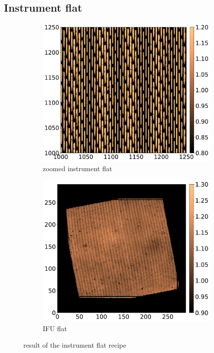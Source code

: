 \documentclass[twoside,single,12pt]{lion-msc}
\begin{document}
\subsection{Instrument flat}
\begin{figure}[!b]
\centering
\begin{subfigure}{.48\textwidth}
  \centering
  \includegraphics[width=1\linewidth]{instrumentflat}
  \caption{zoomed instrument flat}
\end{subfigure}\hfill
\begin{subfigure}{.48\textwidth}
  \centering
  \includegraphics[width=1\linewidth]{IFU_flat}
  \caption{IFU flat}
\end{subfigure}
\caption{result of the instrument flat recipe}
\label{fig:instrumentflatrecipe}
\end{figure}
\end{document}
